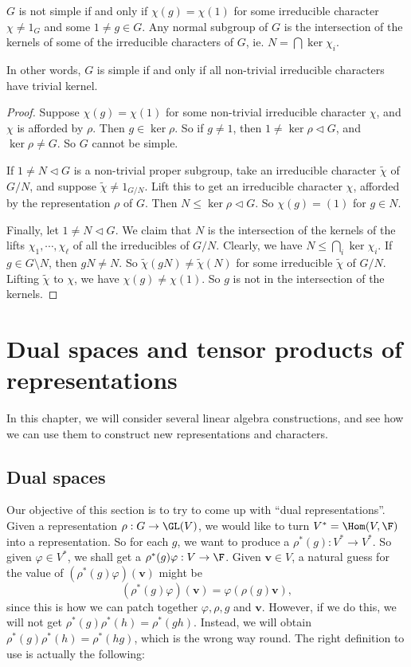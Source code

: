 \documentclass[a4paper]{article}
\begin{document}
\begin{lemma}
  $G$ is not simple if and only if $\chi(g) = \chi(1)$ for some irreducible character $\chi \not= 1_G$ and some $1 \not= g \in G$. Any normal subgroup of $G$ is the intersection of the kernels of some of the irreducible characters of $G$, ie. $N = \bigcap \ker \chi_i$.
\end{lemma}
In other words, $G$ is simple if and only if all non-trivial irreducible characters have trivial kernel.

\begin{proof}
  Suppose $\chi(g) = \chi(1)$ for some non-trivial irreducible character $\chi$, and $\chi$ is afforded by $\rho$. Then $g \in \ker \rho$. So if $g \not= 1$, then $1 \not= \ker \rho \lhd G$, and $\ker \rho \not= G$. So $G$ cannot be simple.

  If $1 \not= N \lhd G$ is a non-trivial proper subgroup, take an irreducible character $\tilde{\chi}$ of $G/N$, and suppose $\tilde{\chi} \not= 1_{G/N}$. Lift this to get an irreducible character $\chi$, afforded by the representation $\rho$ of $G$. Then $N \leq \ker \rho \lhd G$. So $\chi(g) = (1)$ for $g \in N$.

  Finally, let $1 \not= N \lhd G$. We claim that $N$ is the intersection of the kernels of the lifts $\chi_1, \cdots, \chi_\ell$ of all the irreducibles of $G/N$. Clearly, we have $N \leq \bigcap_i \ker \chi_i$. If $g \in G \setminus N$, then $gN \not= N$. So $\tilde{\chi}(gN) \not= \tilde{\chi}(N)$ for some irreducible $\tilde{\chi}$ of $G/N$. Lifting $\tilde{\chi}$ to $\chi$, we have $\chi(g) \not= \chi(1)$. So $g$ is not in the intersection of the kernels. %
\end{proof}

\section{Dual spaces and tensor products of representations}
In this chapter, we will consider several linear algebra constructions, and see how we can use them to construct new representations and characters.

\subsection{Dual spaces}
Our objective of this section is to try to come up with ``dual representations''. Given a representation $\rho: G \to \GL(V)$, we would like to turn $V^* = \Hom(V, \F)$ into a representation. So for each $g$, we want to produce a $\rho^*(g): V^* \to V^*$. So given $\varphi \in V^*$, we shall get a $\rho^*(g) \varphi: V \to \F$. Given $\mathbf{v} \in V$, a natural guess for the value of $(\rho^*(g)\varphi)(\mathbf{v})$ might be
\[
  (\rho^*(g) \varphi)(\mathbf{v}) = \varphi(\rho(g)\mathbf{v}),
\]
since this is how we can patch together $\varphi, \rho, g$ and $\mathbf{v}$. However, if we do this, we will not get $\rho^*(g) \rho^*(h) = \rho^*(gh)$. Instead, we will obtain $\rho^*(g) \rho^*(h) = \rho^*(hg)$, which is the wrong way round. The right definition to use is actually the following:
\end{document}
